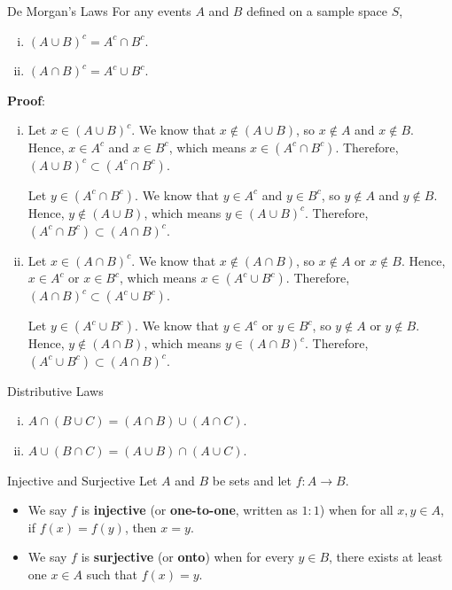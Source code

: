 \begin{Theorem}{De Morgan's Laws}{}
    For any events $ A $ and $ B $ defined on a sample space $ S $,
    \begin{enumerate}[(i)]
        \item $ (A\cup B)^c=A^c\cap B^c $.
        \item $ (A\cap B)^c=A^c\cup B^c $.
    \end{enumerate}
    \tcblower{}
    \textbf{Proof}:
    \begin{enumerate}[(i)]
        \item Let $ x\in (A\cup B)^c $. We know that $ x\notin (A\cup B) $, so
              $ x\notin A $ and $ x\notin B $. Hence, $ x\in A^c $ and $ x\in B^c $, which means
              $ x\in (A^c\cap B^c) $. Therefore, $ (A\cup B)^c\subset (A^c\cap B^c) $.

              Let $ y\in (A^c\cap B^c) $. We know that $ y\in A^c $ and $ y\in B^c $, so
              $ y\notin A $ and $ y\notin B $. Hence, $ y\notin (A\cup B) $, which means
              $ y\in (A\cup B)^c $. Therefore, $ (A^c\cap B^c)\subset (A\cap B)^c $.
        \item Let $ x\in (A\cap B)^c $. We know that $ x\notin (A\cap B) $,
              so $ x\notin A $ or $ x\notin B $. Hence, $ x\in A^c $ or $ x\in B^c $, which means
              $ x\in (A^c\cup B^c) $. Therefore, $ (A\cap B)^c\subset (A^c\cup B^c) $.

              Let $ y\in (A^c\cup B^c) $. We know that $ y\in A^c $ or $ y\in B^c $,
              so $ y\notin A $ or $ y\notin B $. Hence, $ y\notin (A\cap B) $,
              which means $ y\in (A\cap B)^c $. Therefore, $ (A^c\cup B^c)\subset (A\cap B)^c $.
    \end{enumerate}
\end{Theorem}
\begin{Theorem}{Distributive Laws}{}
    \begin{enumerate}[(i)]
        \item $ A\cap (B\cup C)=(A\cap B)\cup (A\cap C) $.
        \item $ A\cup (B\cap C)=(A\cup B)\cap (A\cup C) $.
    \end{enumerate}
\end{Theorem}
\begin{Definition}{Injective and Surjective}{}
    Let $ A $ and $ B $ be sets and let $ f\colon A\to B $.
    \begin{itemize}
        \item We say $ f $ is \textbf{injective} (or \textbf{one-to-one}, written as $ 1\colon 1 $)
              when for all $ x,y\in A $, if $ f(x)=f(y) $, then $ x=y $.
        \item We say $ f $ is \textbf{surjective} (or \textbf{onto}) when for every $ y\in B $,
              there exists at least one $ x\in A $ such that $ f(x)=y $.
    \end{itemize}
\end{Definition}
